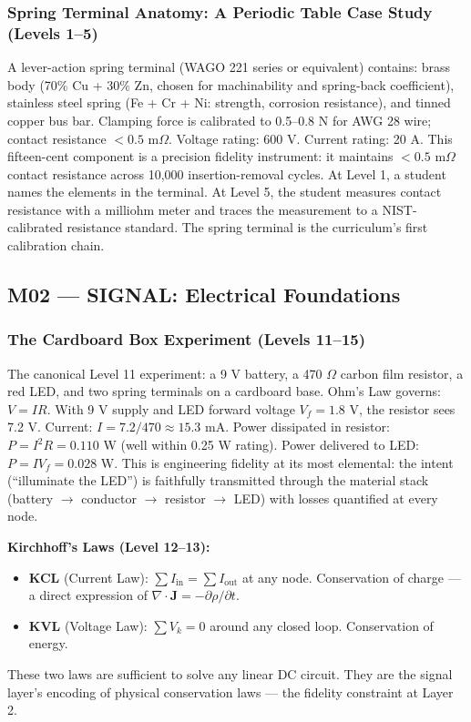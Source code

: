 \documentclass[11pt,letterpaper]{article}
\begin{document}
\subsubsection{Spring Terminal Anatomy: A Periodic Table Case Study (Levels 1--5)}

A lever-action spring terminal (WAGO 221 series or equivalent) contains: brass body
(70\% Cu + 30\% Zn, chosen for machinability and spring-back coefficient), stainless steel
spring (Fe + Cr + Ni: strength, corrosion resistance), and tinned copper bus bar. Clamping
force is calibrated to 0.5--0.8 N for AWG 28 wire; contact resistance $< 0.5$ m$\Omega$.
Voltage rating: 600 V. Current rating: 20 A. This fifteen-cent component is a precision
fidelity instrument: it maintains $< 0.5$ m$\Omega$ contact resistance across 10,000
insertion-removal cycles. At Level 1, a student names the elements in the terminal. At Level 5,
the student measures contact resistance with a milliohm meter and traces the measurement to a
NIST-calibrated resistance standard. The spring terminal is the curriculum's first calibration
chain.

\subsection{M02 --- SIGNAL: Electrical Foundations}

\subsubsection{The Cardboard Box Experiment (Levels 11--15)}

The canonical Level 11 experiment: a 9 V battery, a 470 $\Omega$ carbon film resistor, a red LED,
and two spring terminals on a cardboard base. Ohm's Law governs: $V = IR$. With 9 V supply and
LED forward voltage $V_f = 1.8$ V, the resistor sees 7.2 V. Current: $I = 7.2 / 470 \approx
15.3$ mA. Power dissipated in resistor: $P = I^2 R = 0.110$ W (well within 0.25 W rating).
Power delivered to LED: $P = IV_f = 0.028$ W. This is engineering fidelity at its most
elemental: the intent (``illuminate the LED'') is faithfully transmitted through the material
stack (battery $\rightarrow$ conductor $\rightarrow$ resistor $\rightarrow$ LED) with losses
quantified at every node.

\textbf{Kirchhoff's Laws (Level 12--13):}
\begin{itemize}[leftmargin=*]
  \item \textbf{KCL} (Current Law): $\sum I_{\text{in}} = \sum I_{\text{out}}$ at any node.
    Conservation of charge --- a direct expression of $\nabla \cdot \mathbf{J} = -\partial\rho/\partial t$.
  \item \textbf{KVL} (Voltage Law): $\sum V_k = 0$ around any closed loop. Conservation of energy.
\end{itemize}
These two laws are sufficient to solve any linear DC circuit. They are the signal layer's
encoding of physical conservation laws --- the fidelity constraint at Layer 2.
\end{document}
